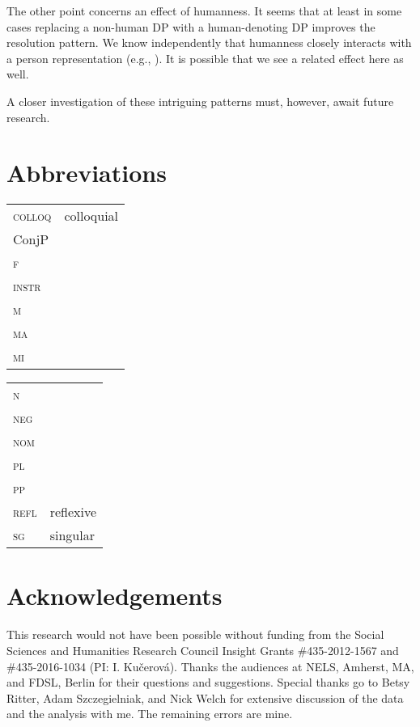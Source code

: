 \documentclass[output=paper,modfontsnewtxmath,hidelinks]{langscibook}
\begin{document}
The other point concerns an effect of humanness. It seems that at least in some cases replacing  a non-human  DP with a human-denoting  DP improves the resolution pattern. We know independently that humanness closely interacts with a person representation (e.g., \citealt{Ritter2014, Wiltschko2015}). It is possible that we see a related effect here as well.

A closer investigation of these intriguing patterns must, however, await future research.


\section*{Abbreviations}

\begin{tabularx}{.5\textwidth}{@{}lQ@{}}
\textsc{colloq}&colloquial\\
ConjP&\\
\textsc{f}&\\
\textsc{instr}&\\
\textsc{m}&\\
\textsc{ma}& \\
\textsc{mi}& \\
\end{tabularx}%
\begin{tabularx}{.5\textwidth}{@{}lQ@{}}
\textsc{n}&\\
\textsc{neg}&\\
\textsc{nom}&\\
\textsc{pl}&\\
\textsc{pp}&\\
\textsc{refl}&reflexive\\
\textsc{sg}&singular\\
\end{tabularx}

\section*{Acknowledgements}
This research would not have been possible without funding from the Social Sciences and Humanities Research Council Insight Grants \#435-2012-1567 and \#435-2016-1034  (PI: I. Kučerová). Thanks the audiences at NELS, Amherst, MA, and FDSL, Berlin for their questions and suggestions. Special thanks go to Betsy Ritter, Adam Szczegielniak, and Nick Welch for extensive discussion of the data and the analysis with me. The remaining errors are mine.

\sloppy
\printbibliography[heading=subbibliography,notkeyword=this]
\clearpage 
\end{document}
